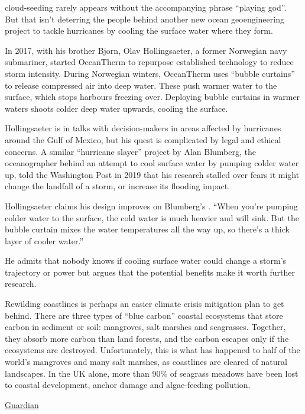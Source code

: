 \documentclass[
]{book}
\begin{document}
cloud-seeding rarely appears without the accompanying phrase ``playing god''. But that isn't deterring the people behind another new ocean geoengineering project to tackle hurricanes by cooling the surface water where they form.

In 2017, with his brother Bjorn, Olav Hollingsaeter, a former Norwegian navy submariner, started OceanTherm to repurpose established technology to reduce storm intensity. During Norwegian winters, OceanTherm uses ``bubble curtains'' to release compressed air into deep water. These push warmer water to the surface, which stops harbours freezing over. Deploying bubble curtains in warmer waters shoots colder deep water upwards, cooling the surface.

Hollingsaeter is in talks with decision-makers in areas affected by hurricanes around the Gulf of Mexico, but his quest is complicated by legal and ethical concerns. A similar ``hurricane slayer'' project by Alan Blumberg, the oceanographer behind an attempt to cool surface water by pumping colder water up, told the Washington Post in 2019 that his research stalled over fears it might change the landfall of a storm, or increase its flooding impact.

Hollingsaeter claims his design improves on Blumberg's . ``When you're pumping colder water to the surface, the cold water is much heavier and will sink. But the bubble curtain mixes the water temperatures all the way up, so there's a thick layer of cooler water.''

He admits that nobody knows if cooling surface water could change a storm's trajectory or power but argues that the potential benefits make it worth further research.

Rewilding coastlines is perhaps an easier climate crisis mitigation plan to get behind. There are three types of ``blue carbon'' coastal ecosystems that store carbon in sediment or soil: mangroves, salt marshes and seagrasses. Together, they absorb more carbon than land forests, and the carbon escapes only if the ecosystems are destroyed.
Unfortunately, this is what has happened to half of the world's mangroves and many salt marshes, as coastlines are cleared of natural landscapes. In the UK alone, more than 90\% of seagrass meadows have been lost to coastal development, anchor damage and algae-feeding pollution.

\href{https://www.theguardian.com/environment/2021/jun/23/cloud-spraying-and-hurricane-slaying-could-geoengineering-fix-the-climate-crisis}{Guardian}
\end{document}
